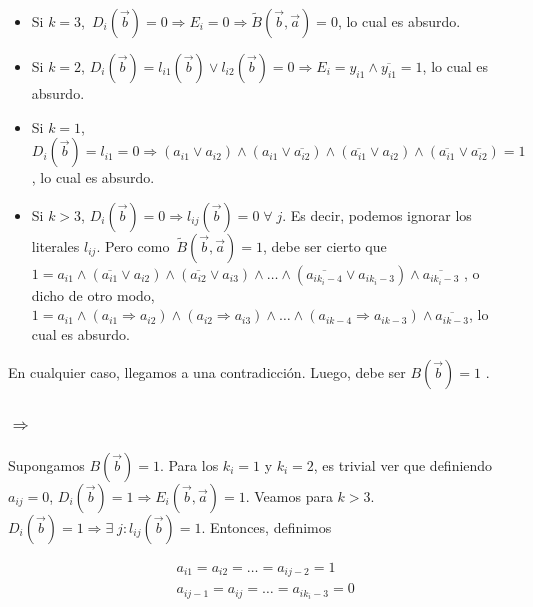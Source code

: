 \documentclass[10pt,a4paper]{article}
\begin{document}
\begin{itemize}

	\item Si $k = 3$, $D_i(\overrightarrow{b}) = 0 \Rightarrow E_i = 0 \Rightarrow \tilde B(\overrightarrow{b} , \overrightarrow{a}) = 0 $, lo cual es absurdo.
	\item Si $k = 2$, $D_i(\overrightarrow{b}) = l_{i1}(\overrightarrow{b}) \lor l_{i2}(\overrightarrow{b} ) = 0 \Rightarrow E_i = y_{i1} \land \overline{y_{i1}} = 1$, lo cual es absurdo.
	\item Si $k = 1$, $D_i(\overrightarrow{b}) = l_{i1} = 0 \Rightarrow (a_{i1} \lor a_{i2}) \land (a_{i1} \lor \overline{a_{i2}}) \land (\overline{a_{i1}} \lor a_{i2}) \land (\overline{a_{i1}} \lor \overline{a_{i2}}) = 1$, lo cual es absurdo.
	\item Si $k > 3$, $D_i(\overrightarrow{b}) = 0 \Rightarrow l_{ij} (\overrightarrow{b}) = 0 \;\forall\;j$. Es decir, podemos ignorar los literales $l_{ij}$. Pero como $\tilde B (\overrightarrow{b},\overrightarrow{a}) = 1$, debe ser cierto que $1 = a_{i1} \land (\overline{a_{i1}} \lor a_{i2}) \land (\overline{a_{i2}} \lor a_{i3}) \land \dots \land (\overline{a_{ik_i-4}} \lor a_{ik_i-3}) \land \overline{a_{ik_i-3}}$ , o dicho de otro modo, $1 = a_{i1} \land (a_{i1} \Rightarrow a_{i2}) \land (a_{i2} \Rightarrow a_{i3}) \land\dots \land (a_{ik-4} \Rightarrow a_{ik-3}) \land \overline{a_{ik-3}}$, lo cual es absurdo.
\end{itemize}

En cualquier caso, llegamos a una contradicción. Luego, debe ser $B(\overrightarrow{b} ) = 1$ .

\subsubsection*{$\Rightarrow$}

Supongamos $B(\overrightarrow{b} ) = 1$. Para los $k_i = 1$ y $k_i = 2$, es trivial ver que definiendo $a_{ij} = 0$, $D_i(\overrightarrow{b}) = 1 \Rightarrow E_i(\overrightarrow{b}, \overrightarrow{a}) = 1$. Veamos para $k > 3$. $D_i(\overrightarrow{b}) = 1 \Rightarrow \exists \;j:l_{ij}(\overrightarrow{b})= 1$. Entonces, definimos

\begin{center}
\begin{align*} &a_{i1} = a_{i2} = \dots = a_{ij-2} = 1\\ &a_{ij-1} =a_{ij} = \dots = a_{ik_i-3}=0 \end{align*}
\end{center}
\end{document}
